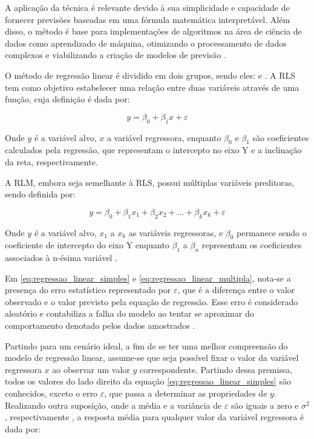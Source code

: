 A aplicação da técnica é relevante devido à sua simplicidade e capacidade de fornecer previsões baseadas em uma fórmula matemática interpretável. Além disso, o método é base para implementações de algoritmos na área de ciência de dados como aprendizado de máquina, otimizando o processamento de dados complexos e viabilizando a criação de modelos de previsão \cite{aws2024}.

O método de regressão linear é dividido em dois grupos, sendo eles:  e  \cite{montgomery2012}. A RLS tem como objetivo estabelecer uma relação entre duas variáveis através de uma função, cuja definição é dada por:

\begin{equation}
	y = \beta_0 + \beta_1 x + \varepsilon
	\label{eq:regressao_linear_simples}
\end{equation}

Onde $y$ é a variável alvo, $x$ a variável regressora, enquanto $\beta_0$ e $\beta_1$ são coeficientes calculados pela regressão, que representam o intercepto no eixo Y e a inclinação da reta, respectivamente.

A RLM, embora seja semelhante à RLS, possui múltiplas variáveis preditoras, sendo definida por:

\begin{equation}
	y = \beta_0 + \beta_1 x_{1} + \beta_2 x_{2} + ... + \beta_k x_{k} + \varepsilon
	\label{eq:regressao_linear_multipla}
\end{equation}

Onde $y$ é a variável alvo, $x_{1}$ a $x_{k}$ as variáveis regressoras, e $\beta_0$ permanece sendo o coeficiente de intercepto do eixo Y enquanto $\beta_1$ a $\beta_n$ representam os coeficientes associados à n-ésima variável \cite{sassi2012}.

Em \ref{eq:regressao_linear_simples} e \ref{eq:regressao_linear_multipla}, nota-se a presença do erro estatístico representado por $\varepsilon$, que é a diferença entre o valor observado e o valor previsto pela equação de regressão. Esse erro é considerado aleatório e contabiliza a falha do modelo ao tentar se aproximar do comportamento denotado pelos dados amostrados \cite{montgomery2012}.

Partindo para um cenário ideal, a fim de se ter uma melhor compreensão do modelo de regressão linear, assume-se que seja possível fixar o valor da variável regressora $x$ ao observar um valor $y$ correspondente. Partindo dessa premissa, todos os valores do lado direito da equação \ref{eq:regressao_linear_simples} são conhecidos, exceto o erro $\varepsilon$, que passa a determinar as propriedades de $y$. Realizando outra suposição, onde a média e a variância de $\varepsilon$ são iguais a zero e $\sigma^2$, respectivamente \cite{montgomery2012}, a resposta média para qualquer valor da variável regressora é dada por:

